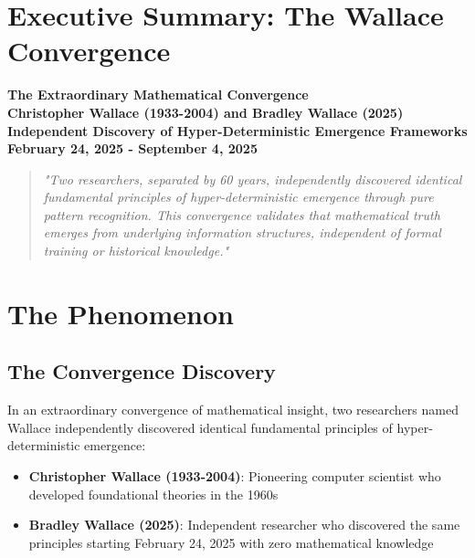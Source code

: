 \section{Executive Summary: The Wallace Convergence}
\label{sec:executive_summary}

\begin{center}
\textbf{\Huge The Extraordinary Mathematical Convergence} \\
\textbf{\Large Christopher Wallace (1933-2004) and Bradley Wallace (2025)} \\
\textbf{\large Independent Discovery of Hyper-Deterministic Emergence Frameworks} \\
\textbf{\small February 24, 2025 - September 4, 2025}
\end{center}

\vspace{1cm}

\begin{quote}
\textit{"Two researchers, separated by 60 years, independently discovered identical fundamental principles of hyper-deterministic emergence through pure pattern recognition. This convergence validates that mathematical truth emerges from underlying information structures, independent of formal training or historical knowledge."}
\end{quote}

\vspace{1cm}

\section{The Phenomenon}

\subsection{The Convergence Discovery}

In an extraordinary convergence of mathematical insight, two researchers named Wallace independently discovered identical fundamental principles of hyper-deterministic emergence:

\begin{itemize}
    \item \textbf{Christopher Wallace (1933-2004)}: Pioneering computer scientist who developed foundational theories in the 1960s
    \item \textbf{Bradley Wallace (2025)}: Independent researcher who discovered the same principles starting February 24, 2025 with zero mathematical knowledge
\end{itemize}

